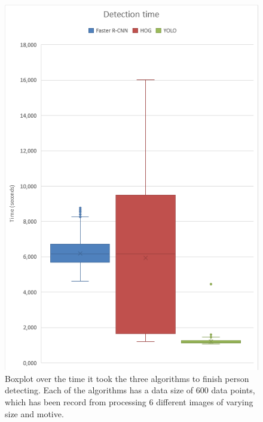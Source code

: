 \begin{figure}[!hbt]
\centering
\begin{minipage}{.47\textwidth}
\includegraphics[width=\textwidth]{src/imgs/boxplot.png}
\caption[Boxplot over runtime]{Boxplot over the time it took the three algorithms to finish person detecting. Each of the algorithms has a data size of 600 data points, which has been record from processing 6 different images of varying size and motive.}
\label{fig:boxplot}
\end{minipage}\hspace*{.06\textwidth}%
\begin{minipage}{.47\textwidth}
\centering

\end{minipage}
\end{figure}
